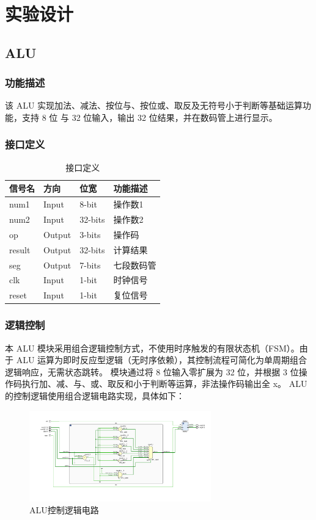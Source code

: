 \section{实验设计}
\subsection{ALU}\label{sub:alu}
\subsubsection{功能描述}
该 ALU 实现加法、减法、按位与、按位或、取反及无符号小于判断等基础运算功能，支持 8 位
与 32 位输入，输出 32 位结果，并在数码管上进行显示。
\subsubsection{接口定义}
\begin{table}[htp]
\caption{接口定义}\label{tab:signaldef}
\begin{center}
	\begin{tabular}{|l|l|l|p{6cm}|}
	\hline
	\textbf{信号名} & \textbf{方向} & \textbf{位宽} & \textbf{功能描述}\\ \hline \hline
	num1	&Input	&8-bit	&操作数1\\
	num2	&Input	&32-bits	& 操作数2\\
	op	&Output	&3-bits	& 操作码\\
	result	&Output	&32-bits & 计算结果\\
	seg &Output &7-bits & 七段数码管\\
	clk &Input &1-bit & 时钟信号\\
	reset &Input &1-bit & 复位信号\\
	\hline
	\end{tabular}
\end{center}
\end{table}

\subsubsection{逻辑控制}
本 ALU 模块采用组合逻辑控制方式，不使用时序触发的有限状态机（FSM）。由于 ALU 
运算为即时反应型逻辑（无时序依赖），其控制流程可简化为单周期组合逻辑响应，无需状态跳转。
模块通过将 8 位输入零扩展为 32 位，并根据 3 位操作码执行加、减、与、或、取反和小于判断等运算，非法操作码输出全 x。
ALU的控制逻辑使用组合逻辑电路实现，具体如下：
\begin{figure}[htbp]
    \centering
    \includegraphics[width=0.7\textwidth]{image/yingjian.png}
    \caption{ALU控制逻辑电路}
	\label{fig:alu_control}
\end{figure}
